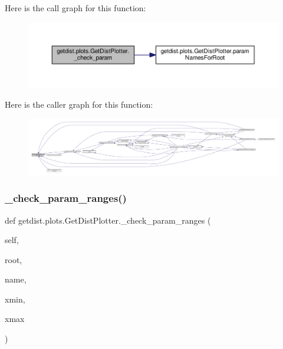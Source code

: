 Here is the call graph for this function\+:
\nopagebreak
\begin{figure}[H]
\begin{center}
\leavevmode
\includegraphics[width=350pt]{classgetdist_1_1plots_1_1GetDistPlotter_a0baa9ed916992d8216ca3cc0ddf4eb4a_cgraph}
\end{center}
\end{figure}
Here is the caller graph for this function\+:
\nopagebreak
\begin{figure}[H]
\begin{center}
\leavevmode
\includegraphics[width=350pt]{classgetdist_1_1plots_1_1GetDistPlotter_a0baa9ed916992d8216ca3cc0ddf4eb4a_icgraph}
\end{center}
\end{figure}
\mbox{\label{classgetdist_1_1plots_1_1GetDistPlotter_a578f829c6d10c20eb150703b876f0411}} 
\subsubsection{\texorpdfstring{\+\_\+check\+\_\+param\+\_\+ranges()}{\_check\_param\_ranges()}}
{\footnotesize\ttfamily def getdist.\+plots.\+Get\+Dist\+Plotter.\+\_\+check\+\_\+param\+\_\+ranges (\begin{DoxyParamCaption}\item[{}]{self,  }\item[{}]{root,  }\item[{}]{name,  }\item[{}]{xmin,  }\item[{}]{xmax }\end{DoxyParamCaption})\hspace{0.3cm}{\ttfamily [private]}}

